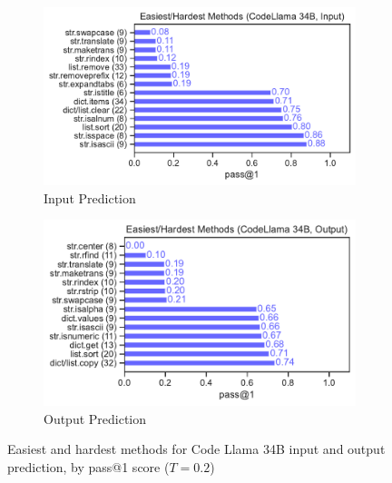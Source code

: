 \begin{figure}[H]
    \centering
    \begin{subfigure}[b]{0.49\textwidth}
        \includegraphics[width=\textwidth]{figs/benchmark/dataset_difficult_methods_codellama_input.pdf}
        \caption{Input Prediction}
    \end{subfigure}
    \begin{subfigure}[b]{0.49\textwidth}
        \includegraphics[width=\textwidth]{figs/benchmark/dataset_difficult_methods_codellama_output.pdf}
        \caption{Output Prediction}
    \end{subfigure}
    \caption{Easiest and hardest methods for Code Llama 34B input and output prediction, by pass@1 score ($T=0.2$)}
    \label{fig:dataset-difficult-cl}
\end{figure}

